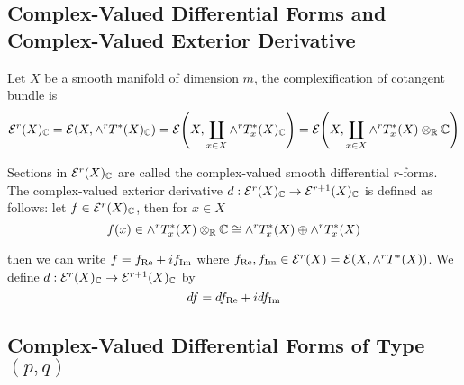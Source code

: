 \subsection{Complex-Valued Differential Forms and Complex-Valued Exterior Derivative}

\begin{definition} 
	
	Let $X$ be a smooth manifold of dimension $m$, the complexification of cotangent bundle is
	$$
		\E^r(X)_\C = \E \tuple*{ X, \wedge^r T^*(X)_\C } = \E \tuple*{ X, \coprod_{x \in X} \wedge^r T_x^*(X)_\C } = \E \tuple*{ X, \coprod_{x \in X} \wedge^r T_x^*(X) \otimes_\R \C }
	$$
	
	Sections in $\mathcal{E}^r(X)_{\mathbb{C}}$ are called the complex-valued smooth differential $r$-forms. The complex-valued exterior derivative $d: \mathcal{E}^r(X)_{\mathbb{C}} \to \mathcal{E}^{r+1}(X)_{\mathbb{C}}$ is defined as follows: let $f \in \mathcal{E}^r(X)_{\mathbb{C}}$, then for $x \in X$
	$$
		f(x) \in \wedge^r T_x^*(X) \otimes_{\mathbb{R}} \mathbb{C} \cong \wedge^r T_x^*(X) \oplus \wedge^r T_x^*(X)
	$$
		
	 then we can write $f = f_{\operatorname{Re}} + i f_{\operatorname{Im}}$ where $f_{\operatorname{Re}}, f_{\operatorname{Im}} \in \mathcal{E}^r(X) = \mathcal{E}(X, \wedge^r T^*(X))$. We define $d: \mathcal{E}^r(X)_{\mathbb{C}} \to \mathcal{E}^{r+1}(X)_{\mathbb{C}}$ by
	$$
		df = d f_{\operatorname{Re}} + i d f_{\operatorname{Im}}
	$$
\end{definition}

\subsection{Complex-Valued Differential Forms of Type $(p, q)$}

